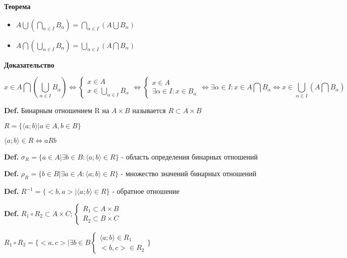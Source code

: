 \documentclass[14pt, letter paper]{article}
\newcommand{\q}[1]{\langle #1 \rangle}
\begin{document}
\begin{center}\textbf{Теорема}\end{center}
\begin{itemize}
    \item $A \bigcup (\bigcap\limits_{\alpha \in I} B_\alpha) = \bigcap\limits_{\alpha \in I} (A \bigcup B_\alpha)$
    \item $A \bigcap (\bigcup\limits_{\alpha \in I} B_\alpha) = \bigcup\limits_{\alpha \in I} (A \bigcap B_\alpha)$
\end{itemize}

\begin{center}
    \textbf{Доказательство}
\end{center}

\[x \in A \bigcap (\bigcup\limits_{\alpha \in I} B_\alpha) \Leftrightarrow \begin{cases} x \in A \\ x \in \bigcup\limits_{\alpha \in I} B_\alpha \end{cases} \Leftrightarrow \begin{cases} x \in A \\ \exists \alpha \in I : x \in B_\alpha \end{cases} \Leftrightarrow \exists \alpha \in I : x \in A \bigcap B_\alpha \Leftrightarrow x \in \bigcup\limits_{\alpha \in I} (A \bigcap B_\alpha)\]

\textbf{Def.} Бинарным отношением R на $A \times B$ называется $R \subset A \times B$ \par
$R = \{\q{a; b} | a \in A, b \in B\}$ \par
$\q{a; b} \in R \Leftrightarrow aRb$

\textbf{Def.} $\sigma_R = \{a \in A | \exists b \in B : \q{a; b} \in R\}$ - область определения бинарных отношений

\textbf{Def.} $\rho_R = \{b \in B | \exists a \in A : \q{a; b} \in R\}$ - множество значений бинарных отношений

\textbf{Def.} $R^{-1} = \{<b, a> | \q{a; b} \in R\}$ - обратное отношение

\textbf{Def.} $R_1 \circ R_2 \subset A \times C; \begin{cases} R_1 \subset A \times B \\ R_2 \subset B \times C \end{cases}$ \par
$R_1 \circ R_2 = \{<a, c> | \exists b \in B \begin{cases} \q{a; b} \in R_1 \\ <b, c> \in R_2 \end{cases} \}$
\end{document}
